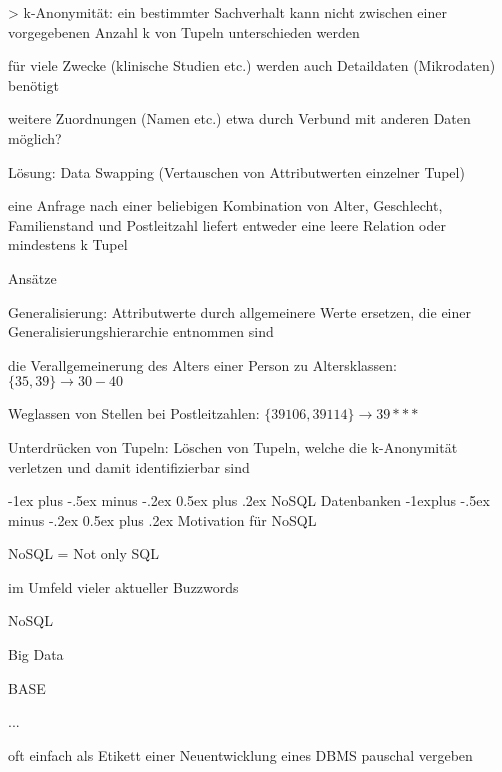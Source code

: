 \documentclass[a4paper]{article}
\makeatletter
\renewcommand{\section}{\@startsection{section}{1}{0mm}%
                                {-1ex plus -.5ex minus -.2ex}%
                                {0.5ex plus .2ex}%
                                {\normalfont\large\bfseries}}
\renewcommand{\subsection}{\@startsection{subsection}{2}{0mm}%
                                {-1explus -.5ex minus -.2ex}%
                                {0.5ex plus .2ex}%
                                {\normalfont\normalsize\bfseries}}
\makeatother
\begin{document}
\begin{multicols}{3}
\begin{itemize*}
    > k-Anonymität: ein bestimmter Sachverhalt kann nicht zwischen einer vorgegebenen Anzahl k von Tupeln unterschieden werden
    \begin{itemize*}
        \item für viele Zwecke (klinische Studien etc.) werden auch Detaildaten (Mikrodaten) benötigt
        \begin{itemize*}
            \item weitere Zuordnungen (Namen etc.) etwa durch Verbund mit anderen Daten möglich?
            \item Lösung: Data Swapping (Vertauschen von Attributwerten einzelner Tupel)
            \item eine Anfrage nach einer beliebigen Kombination von Alter, Geschlecht, Familienstand und Postleitzahl liefert entweder eine leere Relation oder mindestens k Tupel
        \end{itemize*}
        \item Ansätze
        \begin{itemize*}
            \item Generalisierung: Attributwerte durch allgemeinere Werte ersetzen, die einer Generalisierungshierarchie entnommen sind
            \item die Verallgemeinerung des Alters einer Person zu Altersklassen: $\{35, 39\} \rightarrow 30-40$
            \item Weglassen von Stellen bei Postleitzahlen: $\{ 39106, 39114 \}\rightarrow 39***$
            \item Unterdrücken von Tupeln: Löschen von Tupeln, welche die k-Anonymität verletzen und damit identifizierbar sind
        \end{itemize*}
    \end{itemize*}

    \section{NoSQL Datenbanken}
    \subsection{Motivation für NoSQL}
    \begin{itemize*}
        \item NoSQL = Not only SQL
        \item im Umfeld vieler aktueller Buzzwords
        \begin{itemize*}
            \item NoSQL
            \item Big Data
            \item BASE
            \item ...
        \end{itemize*}
        \item oft einfach als Etikett einer Neuentwicklung eines DBMS pauschal vergeben
    \end{itemize*}


\end{itemize*}
\end{multicols}
\end{document}
